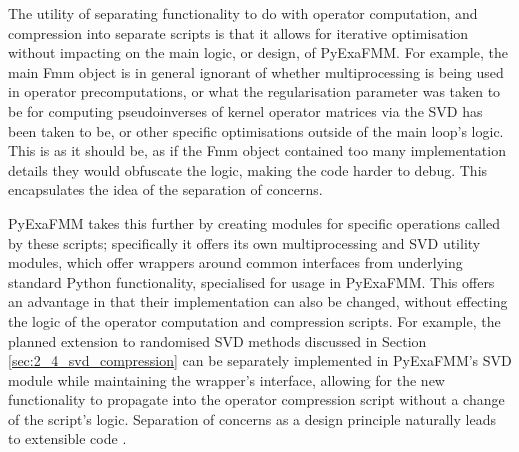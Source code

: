 The utility of separating functionality to do with operator computation, and
compression into separate scripts is that it allows for iterative optimisation
without impacting on the main logic, or design, of \gls{PyExaFMM}. For example,
the main Fmm object is in general ignorant of whether multiprocessing
is being used in operator precomputations, or what the regularisation parameter
was taken to be for computing pseudoinverses of kernel operator matrices
via the SVD has been taken to be, or other specific optimisations outside of the
main loop's logic. This is as it should be, as if the Fmm
object contained too many implementation details they would obfuscate the logic,
making the code harder to debug. This encapsulates the idea of the separation of
concerns.

\gls{PyExaFMM} takes this further by creating modules for specific
operations called by these scripts; specifically it offers its own multiprocessing
and SVD utility modules, which offer wrappers around common interfaces from
underlying standard Python functionality, specialised for usage in \gls{PyExaFMM}.
This offers an advantage in that their implementation can also be changed,
without effecting the logic of the operator computation and compression scripts.
For example, the planned extension to randomised SVD methods discussed in
Section \ref{sec:2_4_svd_compression} can be separately implemented in \gls{PyExaFMM}'s
SVD module while maintaining the wrapper's interface, allowing for the new
functionality to propagate into the operator compression script without
a change of the script's logic. Separation of concerns as a design
principle naturally leads to extensible code \cite{Gamma:1994:Addison}.

